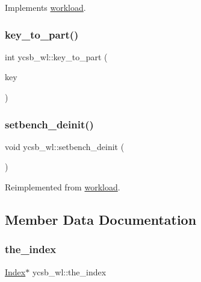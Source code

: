 Implements \hyperlink{classworkload_a3feee79af04069f6c1ad6b7f9b0a045a}{workload}.

\mbox{\label{classycsb__wl_ad6505cf2f6d7113c1825b1c5d5276297}} 
\subsubsection{\texorpdfstring{key\+\_\+to\+\_\+part()}{key\_to\_part()}}
{\footnotesize\ttfamily int ycsb\+\_\+wl\+::key\+\_\+to\+\_\+part (\begin{DoxyParamCaption}\item[{uint64\+\_\+t}]{key }\end{DoxyParamCaption})}

\mbox{\label{classycsb__wl_aba11708593028b3cea7986adb280aae3}} 
\subsubsection{\texorpdfstring{setbench\+\_\+deinit()}{setbench\_deinit()}}
{\footnotesize\ttfamily void ycsb\+\_\+wl\+::setbench\+\_\+deinit (\begin{DoxyParamCaption}{ }\end{DoxyParamCaption})\hspace{0.3cm}{\ttfamily [virtual]}}



Reimplemented from \hyperlink{classworkload_a4614189e85fbaaf2003b7db4c2a7b8b9}{workload}.



\subsection{Member Data Documentation}
\mbox{\label{classycsb__wl_adc52d421067b72cff7d5ef56dd612202}} 
\subsubsection{\texorpdfstring{the\+\_\+index}{the\_index}}
{\footnotesize\ttfamily \hyperlink{classIndex}{Index}$\ast$ ycsb\+\_\+wl\+::the\+\_\+index}

